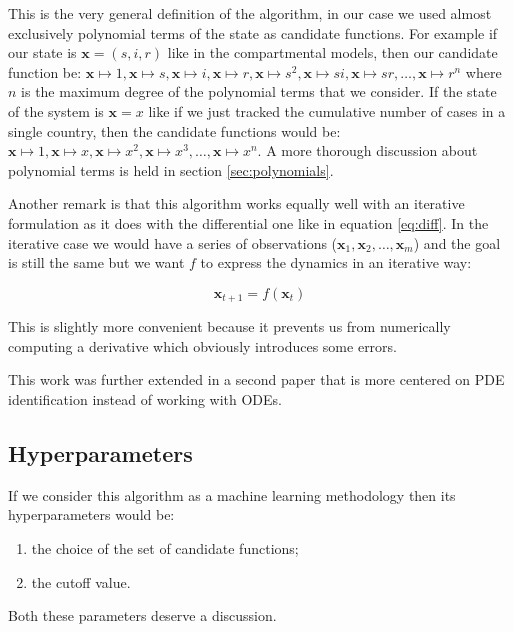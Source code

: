 \documentclass[12pt, letterpaper]{article}
\begin{document}
This is the very general definition of the algorithm, in our case we used almost exclusively polynomial terms of the state as candidate functions. For example if our state is $\mathbf{x} = (s, i, r)$ like in the compartmental models, then our candidate function be: 
$\mathbf{x} \mapsto 1,
\mathbf{x} \mapsto s,
\mathbf{x} \mapsto i,
\mathbf{x} \mapsto r,
\mathbf{x} \mapsto s^2,
\mathbf{x} \mapsto si,
\mathbf{x} \mapsto sr,
\dots,
\mathbf{x} \mapsto r^n$ where $n$ is the maximum degree of the polynomial terms that we consider. If the state of the system is $\mathbf{x} = x$ like if we just tracked the cumulative number of cases in a single country, then the candidate functions would be: $\mathbf{x} \mapsto 1,
\mathbf{x} \mapsto x,
\mathbf{x} \mapsto x^2,
\mathbf{x} \mapsto x^3,
\dots,
\mathbf{x} \mapsto x^n$. A more thorough discussion about polynomial terms is held in section \ref{sec:polynomials}.

Another remark is that this algorithm works equally well with an iterative formulation as it does with the differential one like in equation \ref{eq:diff}.
In the iterative case we would have a series of observations ($\mathbf{x}_1, \mathbf{x}_2, \dots, \mathbf{x}_m$) and the goal is still the same but we want $f$ to express the dynamics in an iterative way:

\begin{equation}\label{eq:it}
\mathbf{x}_{t+1} = f(\mathbf{x}_t)
\end{equation}

This is slightly more convenient because it prevents us from numerically computing a derivative which obviously introduces some errors.

This work was further extended in a second paper \cite{sindypde} that is more centered on PDE identification instead of working with ODEs. 

\subsection{Hyperparameters}

If we consider this algorithm as a machine learning methodology then its hyperparameters would be:
\begin{enumerate} 
    \item the choice of the set of candidate functions;
    \item the cutoff value.
\end{enumerate}

Both these parameters deserve a discussion.
\end{document}
